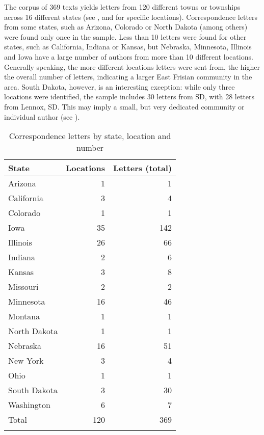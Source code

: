 \documentclass[output=paper]{langsci/langscibook}
\begin{document}
The corpus of 369 texts yields letters from 120 different towns or townships across 16 different states (see , and  for specific locations). Correspondence letters from some states, such as Arizona, Colorado or North Dakota (among others) were found only once in the sample. Less than 10 letters were found for other states, such as California, Indiana or Kansas, but Nebraska, Minnesota, Illinois and Iowa have a large number of authors from more than 10 different locations. Generally speaking, the more different locations letters were sent from, the higher the overall number of letters, indicating a larger East Frisian community in the area. South Dakota, however, is an interesting exception: while only three locations were identified, the sample includes 30 letters from SD, with 28 letters from Lennox, SD. This may imply a small, but very dedicated community or individual author (see ).
 
 
\begin{table}
\begin{tabular}{lrr}
\lsptoprule
{State} & Locations & Letters (total)\\
\midrule
Arizona & 1 & 1\\
California & 3 & 4\\
Colorado & 1 & 1\\
Iowa & 35 & 142\\
Illinois & 26 & 66\\
Indiana & 2 & 6\\
Kansas & 3 & 8\\
Missouri & 2 & 2\\
Minnesota & 16 & 46\\
Montana & 1 & 1\\
North Dakota & 1 & 1\\
Nebraska & 16 & 51\\
New York & 3 & 4\\
Ohio & 1 & 1\\
South Dakota & 3 & 30\\
Washington & 6 & 7\\
\midrule
Total & 120 & 369\\
\lspbottomrule
\end{tabular}
\caption{Correspondence letters by state, location and number\label{tab:rocker:2}}
\end{table}
\end{document}
